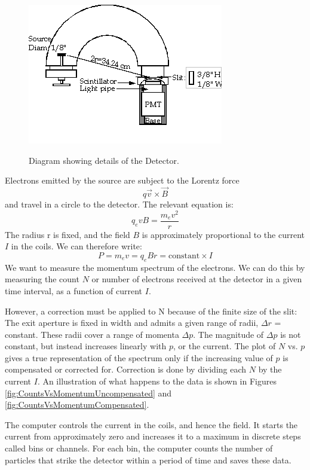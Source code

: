\documentclass{../lab}
\begin{document}
\begin{figure}[h]
    \centering
    \href{http://experimentationlab.berkeley.edu/sites/default/files/images/BRAimage011.gif}{\includegraphics[width=0.5\linewidth]{images/BRAimage011.png}}
    \caption{Diagram showing details of the Detector.}
    \label{fig:BRAimage011}
\end{figure}

Electrons emitted by the source are subject to the Lorentz force
\begin{equation}
    q \vec{v} \times \vec {B}
\end{equation}
and travel in a circle to the detector. The relevant equation is:
\begin{equation}
    q_e v B = \frac {m_e v^2}{r}
\end{equation}
The radius r is fixed, and the field $B$ is approximately proportional to the current $I$ in the coils. We can therefore write:
\begin{equation}
    P = m_e v = q_e B r = \text{constant} \times I
\end{equation}
We want to measure the momentum spectrum of the electrons. We can do this by measuring the count $N$ or number of electrons received at the detector in a given time interval, as a function of current $I$.

However, a correction must be applied to N because of the finite size of the slit: The exit aperture is fixed in width and admits a given range of radii, $\Delta r$ = constant. These radii cover a range of momenta $\Delta p$. The magnitude of $\Delta p$ is not constant, but instead increases linearly with $p$, or the current. The plot of $N$ vs. $p$ gives a true representation of the spectrum only if the increasing value of $p$ is compensated or corrected for. Correction is done by dividing each $N$ by the current $I$. An illustration of what happens to the data is shown in Figures \ref{fig:CountsVsMomentumUncompensated} and \ref{fig:CountsVsMomentumCompensated}.

The computer controls the current in the coils, and hence the field. It starts the current from approximately zero and increases it to a maximum in discrete steps called bins or channels. For each bin, the computer counts the number of particles that strike the detector within a period of time and saves these data.
\end{document}
